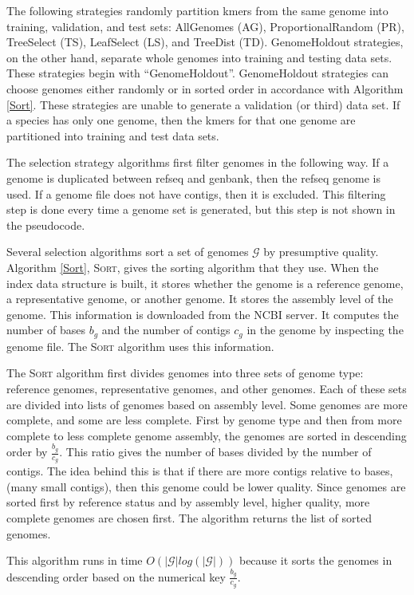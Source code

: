 \documentclass[12pt, letterpaper]{article}
\begin{document}
The following strategies randomly partition kmers from the same genome into training, validation, and test sets: AllGenomes (AG), ProportionalRandom (PR), TreeSelect (TS), LeafSelect (LS), and TreeDist (TD).  GenomeHoldout strategies, on the other hand, separate whole genomes into training and testing data sets.  These strategies begin with ``GenomeHoldout''.  GenomeHoldout strategies can choose genomes either randomly or in sorted order in accordance with Algorithm \ref{Sort}.  These strategies are unable to generate a validation (or third) data set.  If a species has only one genome, then the kmers for that one genome are partitioned into training and test data sets.

The selection strategy algorithms first filter genomes in the following way.  If a genome is duplicated between refseq and genbank, then the refseq genome is used.  If a genome file does not have contigs, then it is excluded.  This filtering step is done every time a genome set is generated, but this step is not shown in the pseudocode.

Several selection algorithms sort a set of genomes $\mathcal{G}$ by presumptive quality.  Algorithm \ref{Sort}, \textsc{Sort}, gives the sorting algorithm that they use.  When the index data structure is built, it stores whether the genome is a reference genome, a representative genome, or another genome.  It stores the assembly level of the genome.  This information is downloaded from the NCBI server.  It computes the number of bases $b_g$ and the number of contigs $c_g$ in the genome by inspecting the genome file.  The \textsc{Sort} algorithm uses this information.

The \textsc{Sort} algorithm first divides genomes into three sets of genome type: reference genomes, representative genomes, and other genomes.  Each of these sets are divided into lists of genomes based on assembly level.  Some genomes are more complete, and some are less complete.  First by genome type and then from more complete to less complete genome assembly, the genomes are sorted in descending order by $\frac{b_g}{c_g}$.  This ratio gives the number of bases divided by the number of contigs.  The idea behind this is that if there are more contigs relative to bases, (many small contigs), then this genome could be lower quality.  Since genomes are sorted first by reference status and by assembly level, higher quality, more complete genomes are chosen first.  The algorithm returns the list of sorted genomes.

This algorithm runs in time $O(\mathcal{|G|}log(\mathcal{|G|}))$ because it sorts the genomes in descending order based on the numerical key $\frac{b_g}{c_g}$.
\end{document}
